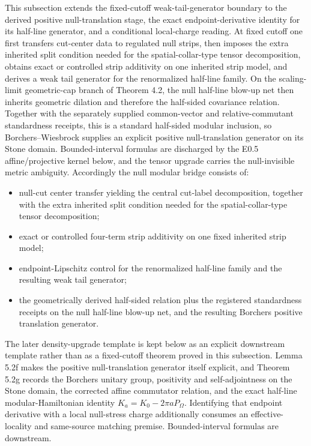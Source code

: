 This subsection extends the fixed-cutoff weak-tail-generator boundary to the derived positive null-translation stage, the exact endpoint-derivative identity for its half-line generator, and a conditional local-charge reading. At fixed cutoff one first transfers cut-center data to regulated null strips, then imposes the extra inherited split condition needed for the spatial-collar-type tensor decomposition, obtains exact or controlled strip additivity on one inherited strip model, and derives a weak tail generator for the renormalized half-line family. On the scaling-limit geometric-cap branch of Theorem 4.2, the null half-line blow-up net then inherits geometric dilation and therefore the half-sided covariance relation. Together with the separately supplied common-vector and relative-commutant standardness receipts, this is a standard half-sided modular inclusion, so Borchers--Wiesbrock supplies an explicit positive null-translation generator on its Stone domain. Bounded-interval formulas are discharged by the E0.5 affine/projective kernel below, and the tensor upgrade carries the null-invisible metric ambiguity. Accordingly the null modular bridge consists of:
\begin{itemize}
\tightlist
\item
  null-cut center transfer yielding the central cut-label decomposition, together with the extra inherited split condition needed for the spatial-collar-type tensor decomposition;
\item
  exact or controlled four-term strip additivity on one fixed inherited strip model;
\item
  endpoint-Lipschitz control for the renormalized half-line family and the resulting weak tail generator;
\item
  the geometrically derived half-sided relation plus the registered standardness receipts on the null half-line blow-up net, and the resulting Borchers positive translation generator.
\end{itemize}
The later density-upgrade template is kept below as an explicit downstream template rather than as a fixed-cutoff theorem proved in this subsection. Lemma 5.2f makes the positive null-translation generator itself explicit, and Theorem 5.2g records the Borchers unitary group, positivity and self-adjointness on the Stone domain, the corrected affine commutator relation, and the exact half-line modular-Hamiltonian identity \(K_a=K_0-2\pi aP_\Omega\). Identifying that endpoint derivative with a local null-stress charge additionally consumes an effective-locality and same-source matching premise. Bounded-interval formulas are downstream.

